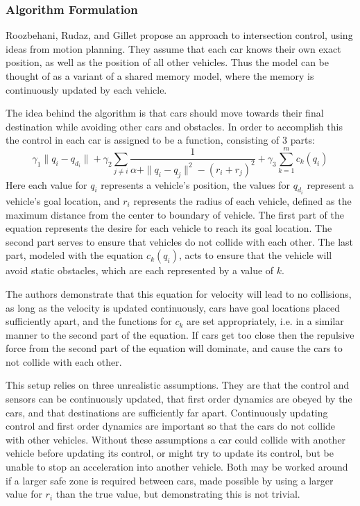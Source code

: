 \documentclass[12pt]{article}
\begin{document}
\subsubsection{Algorithm Formulation}
Roozbehani, Rudaz, and Gillet propose an approach to intersection control, using ideas from motion planning. They assume that each car knows their own exact position, as well as the position of all other vehicles. Thus the model can be thought of as a variant of a shared memory model, where the memory is continuously updated by each vehicle. \par
The idea behind the algorithm is that cars should move towards their final destination while avoiding other cars and obstacles. In order to accomplish this the control in each car is assigned to be a function, consisting of 3 parts:
\begin{equation}
\gamma_1\|q_i - q_{d_i}\| + \gamma_2\sum_{j \neq i} \frac{1}{\alpha + \|q_i - q_j\|^2 - (r_i + r_j)^2} + \gamma_3\sum_{k=1}^m c_k(q_i)
\end{equation}
Here each value for $q_i$ represents a vehicle's position, the values for $q_{d_i}$ represent a vehicle's goal location, and $r_i$ represents the radius of each vehicle, defined as the maximum distance from the center to boundary of vehicle. The first part of the equation represents the desire for each vehicle to reach its goal location. The second part serves to ensure that vehicles do not collide with each other. The last part, modeled with the equation $c_k(q_i)$, acts to ensure that the vehicle will avoid static obstacles, which are each represented by a value of $k$.\par
The authors demonstrate that this equation for velocity will lead to no collisions, as long as the velocity is updated continuously, cars have goal locations placed sufficiently apart, and the functions for $c_k$ are set appropriately, i.e. in a similar manner to the second part of the equation. If cars get too close then the repulsive force from the second part of the equation will dominate, and cause the cars to not collide with each other. \par
This setup relies on three unrealistic assumptions. They are that the control and sensors can be continuously updated, that first order dynamics are obeyed by the cars, and that destinations are sufficiently far apart. Continuously updating control and first order dynamics are important so that the cars do not collide with other vehicles. Without  these assumptions a car could collide with another vehicle before updating its control, or might try to update its control, but be unable to stop an acceleration into another vehicle. Both may be worked around if a larger safe zone is required between cars, made possible by using a larger value for $r_i$ than the true value, but demonstrating this is not trivial. \par
\end{document}
